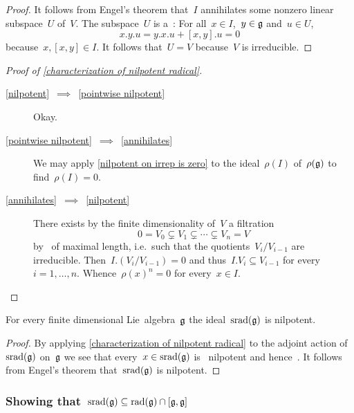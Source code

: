 \begin{proof}
  It follows from Engel’s theorem that~$I$ annihilates some nonzero linear subspace~$U$ of~$V$.
  The subspace~$U$ is a~{\subrepresentation{$\glie$}}:
  For all~$x \in I$,~$y \in \mathfrak{g}$ and~$u \in U$,
  \[
    x.y.u
    =
    y.x.u + [x,y].u
    =
    0
  \]
  because~$x, [x,y] \in I$.
  It follows that~$U = V$ because~$V$ is irreducible.
\end{proof}

\begin{proof}[Proof of \cref{characterization of nilpotent radical}]
  \leavevmode
  \begin{description}
    \item[\ref*{nilpotent}~$\implies$~\ref*{pointwise nilpotent}]
      Okay.
    \item[\ref*{pointwise nilpotent}~$\implies$~\ref*{annihilates}]
      We may apply \cref{nilpotent on irrep is zero} to the ideal~$\rho(I)$ of~$\rho(\mathfrak{g})$ to find~$\rho(I) = 0$.
    \item[\ref*{annihilates}~$\implies$~\ref*{nilpotent}]
      There exists by the finite dimensionality of~$V$ a filtration
      \[
        0
        =
        V_0
        \subsetneq
        V_1
        \subsetneq
        \dotsb
        \subsetneq
        V_n
        =
        V
      \]
      by~{\subrepresentations{$\glie$}} of maximal length, i.e.\ such that the quotients~$V_i/V_{i-1}$ are irreducible.
      Then~$I.(V_i/V_{i-1}) = 0$ and thus~$I.V_i \subseteq V_{i-1}$ for every~$i = 1, \dotsc, n$.
      Whence~$\rho(x)^n = 0$ for every~$x \in I$.
    \qedhere
  \end{description}
\end{proof}

\begin{corollary}
  \label{srad is nilpotent}
  For every finite dimensional Lie~algebra~$\glie$ the ideal~$\operatorname{srad}(\mathfrak{g})$ is nilpotent.
\end{corollary}

\begin{proof}
  By applying \cref{characterization of nilpotent radical} to the adjoint action of~$\operatorname{srad}(\mathfrak{g})$ on~$\glie$ we see that every~$x \in \operatorname{srad}(\mathfrak{g})$ is~{\nilpotent{$\ad_{\glie}$}} nilpotent and hence~{\nilpotent{$\ad_{\srad(\glie)}$}}.
  It follows from Engel’s theorem that~$\operatorname{srad}(\mathfrak{g})$ is nilpotent.
\end{proof}





\subsubsection*{Showing that~$\operatorname{srad}(\mathfrak{g}) \subseteq \operatorname{rad}(\mathfrak{g}) \cap [\mathfrak{g}, \mathfrak{g}]$}

